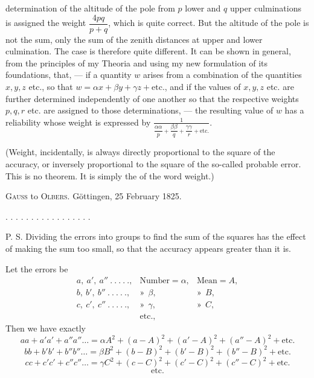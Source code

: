 determination of the altitude of the pole from $p$ lower and $q$ upper culminations is assigned the weight $\dfrac{4pq}{p+q}$, which is quite correct. But the altitude of the pole is not the sum, only  the sum of the zenith distances at upper and lower culmination. The case is therefore quite different. It can be shown in general,  from the principles of my Theoria and  using my new formulation of its foundations, that, --- if a quantity $w$ arises from a combination of the quantities $x,y,z$ etc., so that $w=\alpha x+\beta y+\gamma z+\text{etc.}$, and if the values of $x,y,z$ etc. are further determined independently of one another so that the respective weights $p,q,r$ etc. are assigned to those determinations, --- the resulting value of $w$ has a reliability whose weight is expressed by $\frac{1}{\dfrac{\alpha\alpha}{p}+\dfrac{\beta\beta}{q}+\dfrac{\gamma\gamma}{r}+\text{etc.}} $.

(Weight, incidentally, is always directly proportional to the square of the accuracy, or inversely proportional to the square of the so-called probable error. This is no theorem. It is simply the  of the word weight.)



\begin{center}
\textsc{Gauss} to \textsc{Olbers}. Göttingen, 25 February 1825.
\end{center}

\begin{center}
. . . . . . . . . . . . . . . . .
\end{center}

P. S. Dividing the errors into groups to find the sum of the squares  has the effect of making the sum too small, so that the accuracy appears greater than it is.

Let the errors be
\[
\begin{array}{lll}
a,\ a',\ a''\ .\ .\ .\ .\ ., & \text{Number}=\alpha, & \text{Mean}=A, \\
b,\ b',\ b''\ .\ .\ .\ .\ ., & \text{»}\ \ \beta, & \text{»}\ \ B, \\
c,\ c',\ c''\ .\ .\ .\ .\ ., & \text{»}\ \ \gamma, & \text{»}\ \ C, \\
& \text{etc.,} &
\end{array}
\]
Then we have exactly
\[
aa+a'a'+a''a''\ldots=\alpha A^2+(a-A)^2+(a'-A)^2+(a''-A)^2+\text{etc.}
\]
\[
bb+b'b'+b''b''\ldots=\beta B^2+(b-B)^2+(b'-B)^2+(b''-B)^2+\text{etc.}
\]
\[
cc+c'c'+c''c''\ldots=\gamma C^2+(c-C)^2+(c'-C)^2+(c''-C)^2+\text{etc.}
\]
\[
\text{etc.}
\]

